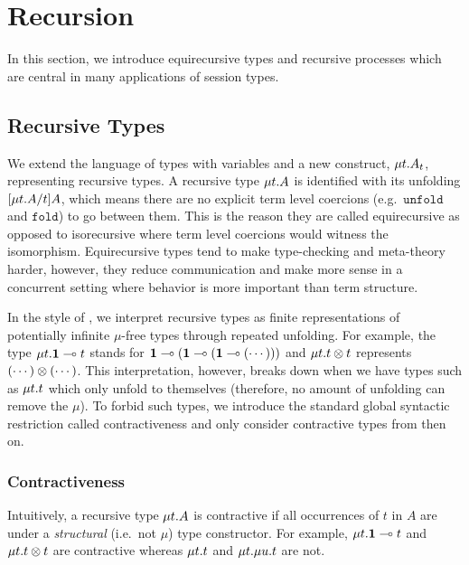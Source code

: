 
\section{Recursion}
\label{base:recursion}

In this section, we introduce equirecursive types and recursive processes which are central in many applications of session types.


\subsection{Recursive Types}
\label{recursive-types}

We extend the language of types with variables and a new construct, $\mu{t} . {A_t}$, representing recursive types. A recursive type $\mu{t} . {A}$ is identified with its unfolding $\lbrack{\mu{t} . {A}}/{t}\rbrack{A}$, which means there are no explicit term level coercions (e.g.\ $\mathtt{unfold}$ and $\mathtt{fold}$) to go between them. This is the reason they are called equirecursive as opposed to isorecursive where term level coercions would witness the isomorphism. Equirecursive types tend to make type-checking and meta-theory harder, however, they reduce communication and make more sense in a concurrent setting where behavior is more important than term structure.

In the style of \cite{AmadioC91}, we interpret recursive types as finite representations of potentially infinite $\mu$-free types through repeated unfolding. For example, the type $\mu{t} . {\mathbf{1} \multimap t}$ stands for $\mathbf{1} \multimap (\mathbf{1} \multimap (\mathbf{1} \multimap (\cdots )))$ and $\mu{t} . {t \otimes t}$ represents $(\cdots) \otimes (\cdots)$. This interpretation, however, breaks down when we have types such as $\mu{t} . {t}$ which only unfold to themselves (therefore, no amount of unfolding can remove the $\mu$). To forbid such types, we introduce the standard global syntactic restriction called contractiveness \cite{StoneS2005, GayH05} and only consider contractive types from then on.


\subsubsection{Contractiveness}

Intuitively, a recursive type $\mu{t} . {A}$ is contractive if all occurrences of $t$ in $A$ are under a \emph{structural} (i.e.\ not $\mu$) type constructor. For example, $\mu{t} . {\mathbf{1} \multimap t}$ and $\mu{t} . {t \otimes t}$ are contractive whereas $\mu{t} . {t}$ and $\mu{t} . {\mu{u} . {t}}$ are not.

